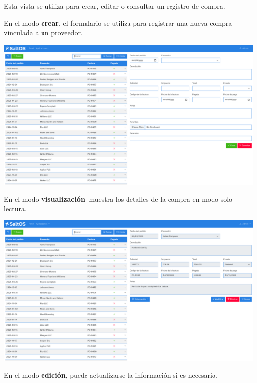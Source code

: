 \documentclass[a4paper]{article}
\begin{document}
Esta vista se utiliza para crear, editar o consultar un registro de compra.

En el modo \textbf{crear}, el formulario se utiliza para registrar una nueva compra vinculada a un proveedor.

\begin{center}\includegraphics[width=1\textwidth]{../ujest/snaps/test-screenshots-js-screenshots-purchases-purchase-create-es-es-1-snap.png}\end{center}

En el modo \textbf{visualización}, muestra los detalles de la compra en modo solo lectura.

\begin{center}\includegraphics[width=1\textwidth]{../ujest/snaps/test-screenshots-js-screenshots-purchases-purchase-view-100-es-es-1-snap.png}\end{center}

En el modo \textbf{edición}, puede actualizarse la información si es necesario.
\end{document}
